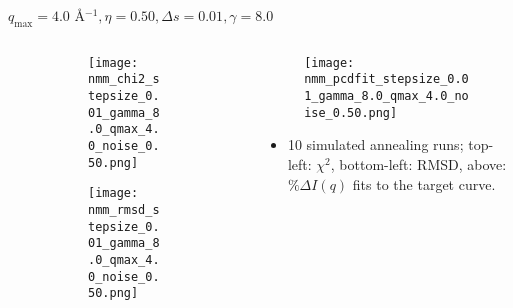 \documentclass{beamer}
\begin{document}
\begin{frame}{$ q_{\textrm{max}}=4.0 $ \AA $^{-1}, \eta=0.50, \Delta s=0.01, \gamma=8.0$}
	\begin{columns}
		\begin{column}{.5\textwidth}
			\begin{figure}[H]
			\centering
			\begin{subfigure}[b]{\textwidth}
				\centering
				\texttt{[image: nmm\_chi2\_stepsize\_0.01\_gamma\_8.0\_qmax\_4.0\_noise\_0.50.png]}
				\label{fig:}
			\end{subfigure}
			\begin{subfigure}[b]{\textwidth}
				\centering
				\texttt{[image: nmm\_rmsd\_stepsize\_0.01\_gamma\_8.0\_qmax\_4.0\_noise\_0.50.png]}
				\label{fig:}
			\end{subfigure}
			\end{figure}
		\end{column}
		\begin{column}{.5\textwidth}
			\begin{figure}[H]
				\centering
				\texttt{[image: nmm\_pcdfit\_stepsize\_0.01\_gamma\_8.0\_qmax\_4.0\_noise\_0.50.png]}
				\label{fig:}
			\end{figure}
			\begin{itemize}
				\item 10 simulated annealing runs; top-left: $\chi^2$, bottom-left: RMSD, above: $\%\Delta I(q)$ fits to the target curve.
			\end{itemize}
		\end{column}
	\end{columns}
\end{frame}
 
\end{document}
